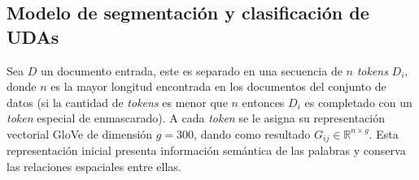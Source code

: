 \documentclass[a4paper,11pt,twocolumn,twoside]{article}
\begin{document}

\subsection{Modelo de segmentación y clasificación de UDAs}\label{ssec:segm_clsf_uda}

Sea $D$ un documento entrada, este es separado en una secuencia de $n$ \textit{tokens} $D_i$, donde $n$ es la mayor longitud encontrada
en los documentos del conjunto de datos (si la cantidad de \textit{tokens} es menor que $n$ entonces $D_i$ es completado con un \textit{token} especial de enmascarado). 
A cada \textit{token} se le asigna
su representación vectorial GloVe de dimensión $g=300$, dando como resultado $G_{ij} \in \mathbb{R}^{n \times g}$.
Esta representación inicial presenta información semántica de las palabras y conserva las relaciones 
espaciales entre ellas. 
\end{document}
